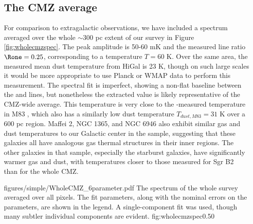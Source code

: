 \subsection{The CMZ average}
For comparison to extragalactic observations, we have included a spectrum
averaged over the whole $\sim300$ pc extent of our survey in Figure
\ref{fig:wholecmzspec}.  The peak amplitude is 50-60 mK and the measured
line ratio $\Rone = 0.25$, corresponding to a temperature $T=60$ K.  
Over the same area, the measured mean dust temperature from HiGal is 23 K,
though on such large scales it would be more appropriate to use Planck or WMAP
data to perform this measurement.
The spectral fit is imperfect, showing a non-flat baseline between the
\threetwoone and \threetwotwo lines, but nonetheless the extracted value is
likely representative of the CMZ-wide average.  This temperature is very close
to the \ammonia-measured temperature in M83 \citep[56 K;][]{Mangum2013a}, which
also has a similarly low dust temperature $T_{dust,M83} = 31$ K over a 600 pc
region.  Maffei 2, NGC 1365, and NGC 6946 also exhibit similar gas and dust
temperatures to our Galactic center in the \citet{Mangum2013a} sample,
suggesting that these galaxies all have analogous gas thermal structures in
their inner regions.  The other galaxies in that sample, especially the
starburst galaxies, have significantly warmer gas and dust, with temperatures
closer to those measured for Sgr B2 than for the whole CMZ.


\Figure
{figures/simple/WholeCMZ_6parameter.pdf}
{The spectrum of the whole survey averaged over all pixels.
The fit parameters, along with the nominal errors on the parameters,
are shown in the legend.  A single-component fit was used, though many
subtler individual components are evident.}
{fig:wholecmzspec}{0.5}{0}


